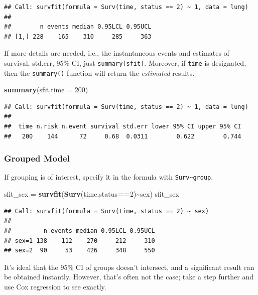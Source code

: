 \documentclass[
]{ctexart}
\newenvironment{Shaded}{\begin{snugshade}}{\end{snugshade}}
\newcommand{\AttributeTok}[1]{\textcolor[rgb]{0.13,0.29,0.53}{#1}}
\newcommand{\DecValTok}[1]{\textcolor[rgb]{0.00,0.00,0.81}{#1}}
\newcommand{\FunctionTok}[1]{\textcolor[rgb]{0.13,0.29,0.53}{\textbf{#1}}}
\newcommand{\NormalTok}[1]{#1}
\newcommand{\OtherTok}[1]{\textcolor[rgb]{0.56,0.35,0.01}{#1}}
\newcommand{\SpecialCharTok}[1]{\textcolor[rgb]{0.81,0.36,0.00}{\textbf{#1}}}
\begin{document}
\begin{verbatim}
## Call: survfit(formula = Surv(time, status == 2) ~ 1, data = lung)
## 
##        n events median 0.95LCL 0.95UCL
## [1,] 228    165    310     285     363
\end{verbatim}

If more details are needed, i.e., the instantaneous events and estimates
of survival, std.err, 95\% CI, just \texttt{summary(sfit)}. Moreover, if
\texttt{time} is designated, then the \texttt{summary()} function will
return the \emph{estimated} results.

\begin{Shaded}
\begin{Highlighting}[]
\FunctionTok{summary}\NormalTok{(sfit,}\AttributeTok{time =} \DecValTok{200}\NormalTok{)}
\end{Highlighting}
\end{Shaded}

\begin{verbatim}
## Call: survfit(formula = Surv(time, status == 2) ~ 1, data = lung)
## 
##  time n.risk n.event survival std.err lower 95% CI upper 95% CI
##   200    144      72     0.68  0.0311        0.622        0.744
\end{verbatim}

\hypertarget{grouped-model}{%
\subsubsection{Grouped Model}\label{grouped-model}}

If grouping is of interest, specify it in the formula with
\texttt{Surv\textasciitilde{}group}.

\begin{Shaded}
\begin{Highlighting}[]
\NormalTok{sfit\_sex }\OtherTok{=} \FunctionTok{survfit}\NormalTok{(}\FunctionTok{Surv}\NormalTok{(time,status}\SpecialCharTok{==}\DecValTok{2}\NormalTok{)}\SpecialCharTok{\textasciitilde{}}\NormalTok{sex)}
\NormalTok{sfit\_sex}
\end{Highlighting}
\end{Shaded}

\begin{verbatim}
## Call: survfit(formula = Surv(time, status == 2) ~ sex)
## 
##         n events median 0.95LCL 0.95UCL
## sex=1 138    112    270     212     310
## sex=2  90     53    426     348     550
\end{verbatim}

It's ideal that the 95\% CI of groups doesn't intersect, and a
significant result can be obtained instantly. However, that's often not
the case; take a step further and use Cox regression to see exactly.
\end{document}
